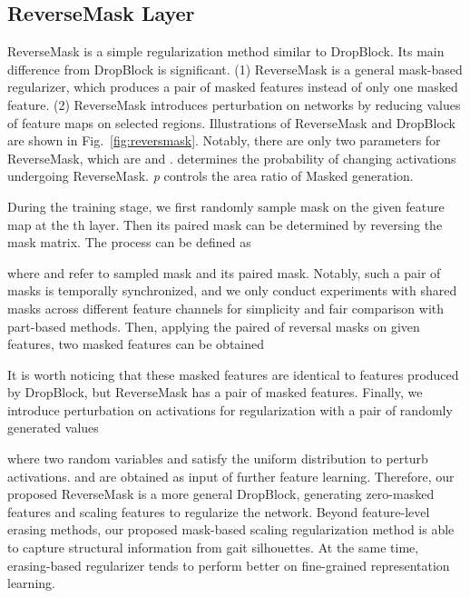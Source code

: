\documentclass[runningheads]{llncs}
\begin{document}
\subsection{ReverseMask Layer}
\label{subsection:revermask}

    ReverseMask is a simple regularization method similar to DropBlock. Its main difference from DropBlock is significant. (1) ReverseMask is a general mask-based regularizer, which produces a pair of masked features instead of only one masked feature. (2) ReverseMask introduces perturbation on networks by reducing values of feature maps on selected regions. Illustrations of ReverseMask and DropBlock are shown in Fig.~\ref{fig:reversmask}. Notably, there are only two parameters for ReverseMask, which are {} and .  determines the probability of changing activations undergoing ReverseMask. \textit{p} controls the area ratio of Masked generation. 
    
    During the training stage, we first randomly sample mask on the given feature map  at the th layer. Then its paired mask can be determined by reversing the mask matrix. The process can be defined as
        
        
    where  and  refer to sampled mask and its paired mask. Notably, such a pair of masks is temporally synchronized, and we only conduct experiments with shared masks across different feature channels for simplicity and fair comparison with part-based methods. Then, applying the paired of reversal masks on given features, two masked features can be obtained
        
        
    It is worth noticing that these masked features are identical to features produced by DropBlock, but ReverseMask has a pair of masked features. Finally, we introduce perturbation on activations for regularization with a pair of randomly generated values
            
        
        
    where two random variables  and  satisfy the uniform distribution to perturb activations.  and  are obtained as input of further feature learning.
    Therefore, our proposed ReverseMask is a more general DropBlock, generating zero-masked features and scaling features to regularize the network. Beyond feature-level erasing methods, our proposed mask-based scaling regularization method is able to capture structural information from gait silhouettes. At the same time, erasing-based regularizer tends to perform better on fine-grained representation learning.
\end{document}
